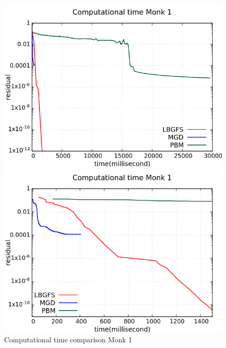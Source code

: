 \begin{figure}[H]
	\centering
	\begin{minipage}[t]{0.5\linewidth}
		\includegraphics[width=\linewidth]{data/Comparison/Monk1/Monk1_CT_Comparison_log_standard.png}
	\end{minipage}%
	\begin{minipage}[t]{0.5\linewidth}
		\includegraphics[width=\linewidth]{data/Comparison/Monk1/Monk1_CT_Comparison_log_zoom.png}
	\end{minipage}
	\caption{Computational time comparison Monk 1}
	\label{CT-Monk1}
\end{figure}
